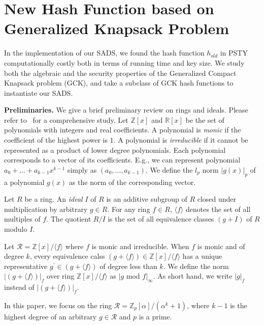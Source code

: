 \vfill\eject\section{New Hash Function based on Generalized Knapsack Problem}\label{gck}
In the implementation of our SADS, we found the hash function $h_{old}$ in PSTY~\cite{DBLP:conf/eurocrypt/PapamanthouSTY13} computationally costly both in terms of running time and key size.  
We study both the algebraic and the security properties of the Generalized Compact Knapsack problem (GCK), and take a subclass of GCK hash functions to instantiate our SADS.

{\bf Preliminaries.} We give a brief preliminary review on rings and ideals. Please refer to~\cite{algebrabook} for a comprehensive study. Let $\mathbb{Z}[x]$ and $\mathbb{R}[x]$ be the set of polynomials with integers and real coefficients. A polynomial is {\it monic} if the coefficient of the highest power is $1$. A polynomial is {\it irreducible} if it cannot be represented as a product of lower degree polynomials. Each polynomial corresponds to a vector of its coefficients. E.g., we can represent polynomial $a_{0}+\ldots+a_{k-1}x^{k-1}$ simply as $(a_{0},\ldots,a_{k-1})$. We define the $l_{p}$ norm $|g(x)|_{p}$ of a polynomial $g(x)$ as the norm of the corresponding vector.

Let $R$ be a ring. An {\it ideal} $I$ of $R$ is an additive subgroup of $R$ closed under multiplication by arbitrary $g \in R$. For any ring $f \in R$, $\langle f \rangle$ denotes the set of all multiples of $f$. The quotient $R/I$ is the set of all equivalence classes $(g+I)$ of $R$ modulo $I$.

Let $\mathcal{R}= \mathbb{Z}[x]/\langle f \rangle$ where $f$ is monic and irreducible. When $f$ is monic and of degree $k$, every equivalence calss $(g+\langle f \rangle) \in \mathbb{Z}[x]/\langle f \rangle$ has a unique representative $g^{'} \in (g+\langle f \rangle) $ of degree less than $k$. We define the norm $|(g+\langle f \rangle)|_{f}$ over ring $ \mathbb{Z}[x]/\langle f \rangle$ as $|g$ mod $f|_{\infty}$. As short hand, we write $|g|_{f}$ instead of $|(g+\langle f \rangle)|_{f}$. 

In this paper, we focus on the ring $\mathcal{R}= \mathbb{Z}_{p}[\alpha]/(\alpha^{k}+1)$, where $k-1$ is the highest degree of an arbitrary $g \in \mathcal{R}$ and $p$ is a prime. 
